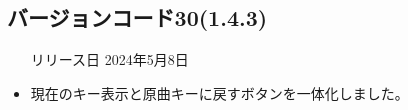 \subsection*{バージョンコード30(1.4.3)}
\begin{itemize}
    \item[リリース日] 2024年5月8日
\end{itemize}

\new

\change
\begin{itemize}
    \item 現在のキー表示と原曲キーに戻すボタンを一体化しました。
\end{itemize}

\fix

